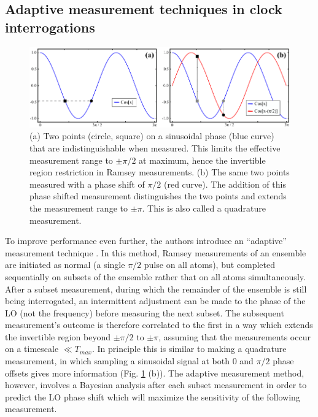 
\subsection{Adaptive measurement techniques in clock interrogations}


\begin{figure}[ht]
    \begin{center}
        \includegraphics{figures/5/Fig_quadrature}
        \caption{\label{fig:quadrature} (a) Two points (circle, square) on a sinusoidal phase (blue curve) that are indistinguishable when measured. This limits the effective measurement range to $\pm \pi / 2$ at maximum, hence the invertible region restriction in Ramsey measurements. (b) The same two points measured with a phase shift of $\pi / 2$ (red curve). The addition of this phase shifted measurement distinguishes the two points and extends the measurement range to $\pm \pi$. This is also called a quadrature measurement. }
    \end{center}
\end{figure}

To improve performance even further, the authors introduce an ``adaptive'' measurement technique \cite{BSsup}. In this method, Ramsey measurements of an ensemble are initiated as normal (a single $\pi / 2$ pulse on all atoms), but completed sequentially on subsets of the ensemble rather that on all atoms simultaneously. After a subset measurement, during which the remainder of the ensemble is still being interrogated, an intermittent adjustment can be made to the phase of the LO (not the frequency) before measuring the next subset. The subsequent measurement's outcome is therefore correlated to the first in a way which extends the invertible region beyond $\pm \pi / 2$ to $\pm \pi$, assuming that the measurements occur on a timescale $\ll T_{max}$. In principle this is similar to making a quadrature measurement, in which sampling a sinusoidal signal at both 0 and $\pi / 2$ phase offsets gives more information (Fig. \ref{fig:quadrature} (b)). The adaptive measurement method, however, involves a Bayesian analysis after each subset measurement in order to predict the LO phase shift which will maximize the sensitivity of the following measurement. 

